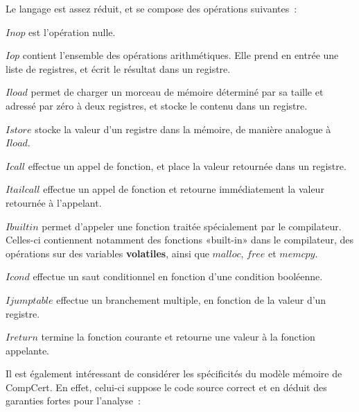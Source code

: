 \documentclass{article}
\begin{document}
Le langage est assez réduit, et se compose des opérations suivantes~:

\begin{description}

\item {}$Inop$ est l'opération nulle.

\item {}$Iop$ contient l'ensemble des opérations arithmétiques. Elle
prend en entrée une liste de registres, et écrit le résultat dans un registre.

\item {}$Iload$ permet de charger un morceau de mémoire déterminé par
sa taille et adressé par zéro à deux registres, et stocke le contenu dans un
registre.

\item {}$Istore$ stocke la valeur d'un registre dans la mémoire, de
manière analogue à $Iload$.

\item {}$Icall$ effectue un appel de fonction, et place la valeur
retournée dans un registre.

\item {}$Itailcall$ effectue un appel de fonction et retourne
immédiatement la valeur retournée à l'appelant.

\item {}$Ibuiltin$ permet d'appeler une fonction traitée spécialement
par le compilateur. Celles-ci contiennent notamment des fonctions «built-in»
dans le compilateur, des opérations sur des variables {\bf \glspl{volatile}},
ainsi que $malloc$, $free$ et $memcpy$.

\item {}$Icond$ effectue un saut conditionnel en fonction d'une
condition booléenne.

\item {}$Ijumptable$ effectue un branchement multiple, en fonction de
la valeur d'un registre.

\item {}$Ireturn$ termine la fonction courante et retourne une valeur à
la fonction appelante.

\end{description}

Il est également intéressant de considérer les spécificités du modèle mémoire
de CompCert. En effet, celui-ci suppose le code source correct et en déduit des
garanties fortes pour l'analyse~:
\end{document}
